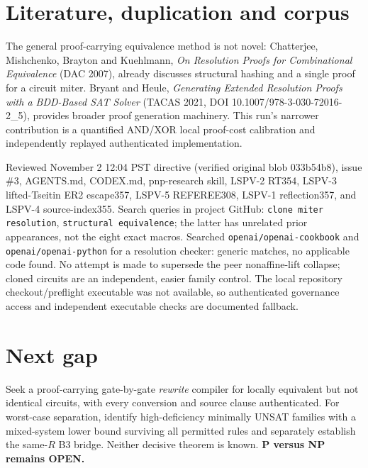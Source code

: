 \documentclass[11pt]{article}
\begin{document}
\section*{Literature, duplication and corpus}
The general proof-carrying equivalence method is not novel: Chatterjee, Mishchenko, Brayton and Kuehlmann, \emph{On Resolution Proofs for Combinational Equivalence} (DAC 2007), already discusses structural hashing and a single proof for a circuit miter. Bryant and Heule, \emph{Generating Extended Resolution Proofs with a BDD-Based SAT Solver} (TACAS 2021, DOI 10.1007/978-3-030-72016-2\_5), provides broader proof generation machinery. This run's narrower contribution is a quantified AND/XOR local proof-cost calibration and independently replayed authenticated implementation.

Reviewed November 2 12:04 PST directive (verified original blob 033b54b8), issue \#3, AGENTS.md, CODEX.md, pnp-research skill, LSPV-2 RT354, LSPV-3 lifted-Tseitin ER2 escape357, LSPV-5 REFEREE308, LSPV-1 reflection357, and LSPV-4 source-index355. Search queries in project GitHub: \texttt{clone miter resolution}, \texttt{structural equivalence}; the latter has unrelated prior appearances, not the eight exact macros. Searched \texttt{openai/openai-cookbook} and \texttt{openai/openai-python} for a resolution checker: generic matches, no applicable code found. No attempt is made to supersede the peer nonaffine-lift collapse; cloned circuits are an independent, easier family control. The local repository checkout/preflight executable was not available, so authenticated governance access and independent executable checks are documented fallback.

\section*{Next gap}
Seek a proof-carrying gate-by-gate \emph{rewrite} compiler for locally equivalent but not identical circuits, with every conversion and source clause authenticated. For worst-case separation, identify high-deficiency minimally UNSAT families with a mixed-system lower bound surviving all permitted rules and separately establish the same-$R$ B3 bridge. Neither decisive theorem is known. \textbf{P versus NP remains OPEN.}
\end{document}
